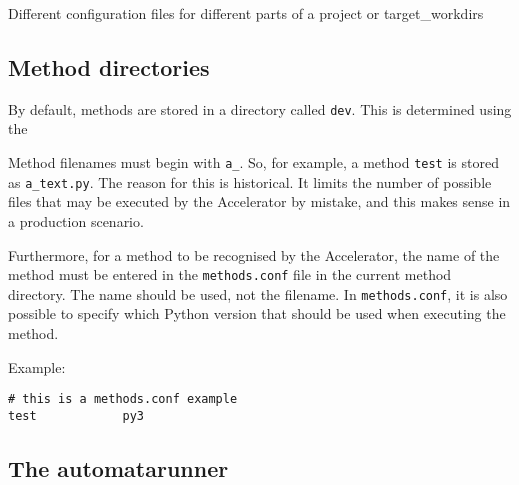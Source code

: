 \documentclass[a4paper]{article}
\begin{document}
Different configuration files for different parts of a project or target\_workdirs


\subsection{Method directories}
By default, methods are stored in a directory called \texttt{dev}.
This is determined using the 

Method filenames must begin with \texttt{a\_}.  So, for example, a
method \texttt{test} is stored as \texttt{a\_text.py}.  The reason for
this is historical.  It limits the number of possible files that may
be executed by the Accelerator by mistake, and this makes sense in a
production scenario.

Furthermore, for a method to be recognised by the Accelerator, the
name of the method must be entered in the \texttt{methods.conf} file
in the current method directory.  The name should be used, not the
filename.  In \texttt{methods.conf}, it is also possible to specify
which Python version that should be used when executing the method.

Example:
\begin{verbatim}
# this is a methods.conf example
test            py3
\end{verbatim}









\subsection{The automatarunner}
\end{document}
